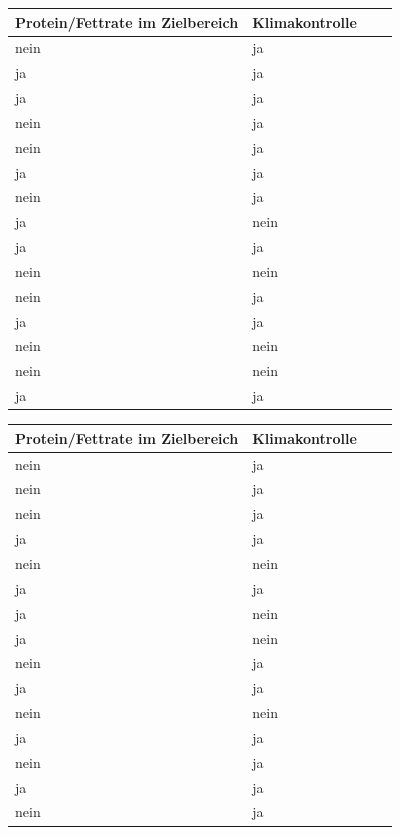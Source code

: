 \documentclass[a4paper, 9pt]{scrartcl}\usepackage[]{graphicx}\usepackage[]{xcolor}
\begin{document}
\begin{center}
\begin{minipage}[t]{0.45\textwidth}
\begin{center}

\begin{tabular}{p{2.5cm}p{2.5cm}p{2.5cm}p{2.5cm}}
\toprule
Protein/Fettrate im Zielbereich & Klimakontrolle\\
\midrule
nein & ja\\
ja & ja\\
ja & ja\\
nein & ja\\
nein & ja\\
\addlinespace
ja & ja\\
nein & ja\\
ja & nein\\
ja & ja\\
nein & nein\\
\addlinespace
nein & ja\\
ja & ja\\
nein & nein\\
nein & nein\\
ja & ja\\
\bottomrule
\end{tabular}


\end{center}
\end{minipage}
\begin{minipage}[t]{0.45\textwidth}
\begin{center}

\begin{tabular}{p{2.5cm}p{2.5cm}p{2.5cm}p{2.5cm}}
\toprule
Protein/Fettrate im Zielbereich & Klimakontrolle\\
\midrule
nein & ja\\
nein & ja\\
nein & ja\\
ja & ja\\
nein & nein\\
\addlinespace
ja & ja\\
ja & nein\\
ja & nein\\
nein & ja\\
ja & ja\\
\addlinespace
nein & nein\\
ja & ja\\
nein & ja\\
ja & ja\\
nein & ja\\
\bottomrule
\end{tabular}


\end{center}
\end{minipage}
\end{center}
\end{document}
